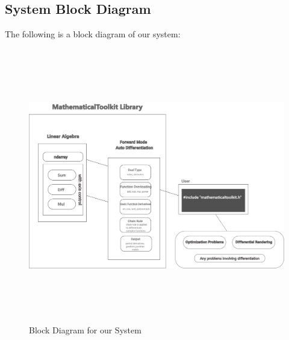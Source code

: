 \documentclass[12pt]{article}
\begin{document}
\subsection{System Block Diagram}
The following is a block diagram of our system:
\begin{center}
\begin{figure}[htb]	
	\includegraphics[width=1\linewidth,height = 12cm,scale=1.0]{Component-2-1.pdf}
	\centering
	\caption{Block Diagram for our System}
	\label{fig:BlockDiag}
\end{figure}
\end{center}

\newpage
\end{document}
